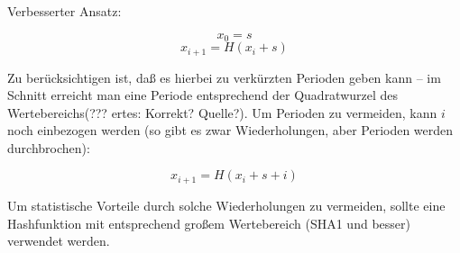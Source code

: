 Verbesserter Ansatz:

$$x_0 = s$$
$$x_{i+1} = H(x_i + s)$$

Zu berücksichtigen ist, daß es hierbei zu verkürzten Perioden geben kann -- im Schnitt erreicht man eine Periode entsprechend der Quadratwurzel des Wertebereichs(??? ertes: Korrekt? Quelle?). Um Perioden zu vermeiden, kann $i$ noch einbezogen werden (so gibt es zwar Wiederholungen, aber Perioden werden durchbrochen):

$$x_{i+1} = H(x_i + s + i)$$

Um statistische Vorteile durch solche Wiederholungen zu vermeiden, sollte eine Hashfunktion mit entsprechend großem Wertebereich (SHA1 und besser) verwendet werden.


